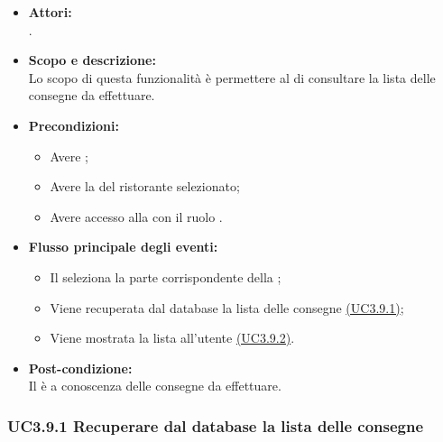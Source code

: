 \begin{itemize}
	\item \textbf{Attori:}
	\\.
	\item \textbf{Scopo e descrizione:} 
	\\Lo scopo di questa funzionalità è permettere al  di consultare la lista delle consegne da effettuare.
	\item \textbf{Precondizioni:}
	\begin{itemize}
		\item Avere ;
		\item Avere la  del ristorante selezionato;
		\item Avere accesso alla  con il ruolo .
	\end{itemize}
	\item \textbf{Flusso principale degli eventi:}
	\begin{itemize}
		\item Il  seleziona la parte corrispondente della ;
		\item Viene recuperata dal database la lista delle consegne \hyperref[UC3.9.1]{(UC3.9.1)};
		\item Viene mostrata la lista all'utente \hyperref[UC3.9.2]{(UC3.9.2)}.
	\end{itemize}
	\item \textbf{Post-condizione:}
	\\Il {} è a conoscenza delle consegne da effettuare.
\end{itemize}

\subsubsection{UC3.9.1 Recuperare dal database la lista delle consegne} \label{UC3.9.1}

